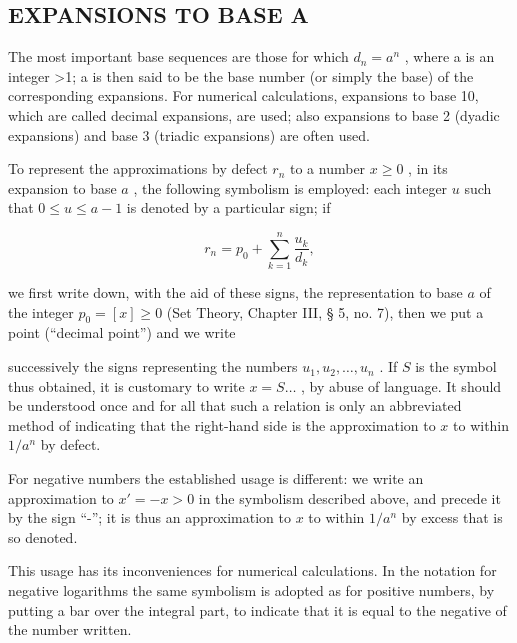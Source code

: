 \subsection{EXPANSIONS TO BASE A}

The most important base sequences are those for which \(d_{n}=a^{n}\) , where a is an integer \textgreater1; a is then said to be the base number (or simply the base) of the corresponding expansions. For numerical calculations, expansions to base 10, which are called decimal expansions, are used; also expansions to base 2 (dyadic expansions) and base 3 (triadic expansions) are often used.

To represent the approximations by defect \(r_n\) to a number \(x \geqslant 0\) , in its expansion to base \(a\) , the following symbolism is employed: each integer \(u\) such that \(0 \leqslant u \leqslant a - 1\) is denoted by a particular sign; if

\[
r _ {n} = p _ {0} + \sum_ {k = 1} ^ {n} \frac {u _ {k}}{d _ {k}},
\]

we first write down, with the aid of these signs, the representation to base \(a\) of the integer \(p_{0}=[x]\geqslant0\) (Set Theory, Chapter III, § 5, no. 7), then we put a point (``decimal point'') and we write

successively the signs representing the numbers \(u_1, u_2, \ldots, u_n\) . If \(S\) is the symbol thus obtained, it is customary to write \(x = S \ldots\) , by abuse of language. It should be understood once and for all that such a relation is only an abbreviated method of indicating that the right-hand side is the approximation to \(x\) to within \(1/a^n\) by defect.

For negative numbers the established usage is different: we write an approximation to \(x' = -x > 0\) in the symbolism described above, and precede it by the sign ``-''; it is thus an approximation to \(x\) to within \(1/a^n\) by excess that is so denoted.

This usage has its inconveniences for numerical calculations. In the notation for negative logarithms the same symbolism is adopted as for positive numbers, by putting a bar over the integral part, to indicate that it is equal to the negative of the number written.

